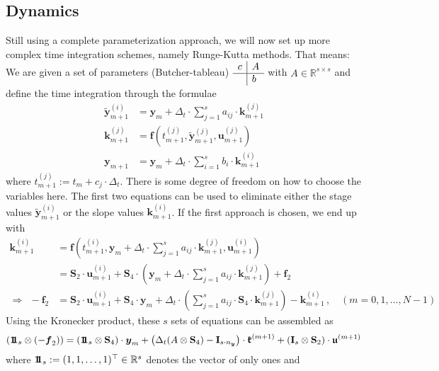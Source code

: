 \documentclass{article}
\newcommand{\defeq}{\mathrel{:=}}%
\newcommand{\tp}{\top}%
\newcommand{\kron}{\otimes}%
\newcommand{\setR}{\mathbb{R}}%
\newcommand{\vectorfont}[1]{\boldsymbol{#1}}%
\newcommand{\matrixfont}[1]{\mathbf{#1}}%
\newcommand{\fvec}{\vectorfont{f}}
\newcommand{\kvec}{\vectorfont{k}}
\newcommand{\uvec}{\vectorfont{u}}
\newcommand{\yvec}{\vectorfont{y}}
\newcommand{\tildeyvec}{\vectorfont{\tilde{y}}}
\newcommand{\kfrakvec}{\vectorfont{\mathfrak{k}}}
\newcommand{\ufrakvec}{\vectorfont{\mathfrak{u}}}
\newcommand{\einsvec}{\vectorfont{1}\negthinspace\negthinspace\vectorfont{1}} %
\newcommand{\Imat}{\matrixfont{I}}%
\newcommand{\Smat}{\matrixfont{S}}
\begin{document}
\subsection*{Dynamics}
%
Still using a complete parameterization approach, we will now set up more complex time integration schemes, namely Runge-Kutta methods.
That means: We are given a set of parameters (Butcher-tableau) $\begin{array}{r|l}c & A\\\hline & b\end{array}$ with $A \in \setR^{s \times s}$ and define the time integration through the formulae
\begin{equation}
\begin{split}
\tildeyvec_{m+1}^{(i)} &= \yvec_{m} + \Delta_t \cdot \sum_{j=1}^s a_{ij} \cdot \kvec_{m+1}^{(j)} \\
\kvec_{m+1}^{(j)} &= \fvec \left(t_{m+1}^{(j)}, \tildeyvec_{m+1}^{(j)}, \uvec_{m+1}^{(j)}  \right)\\
\yvec_{m+1} &= \yvec_m + \Delta_t \cdot \sum_{i=1}^s b_i \cdot \kvec_{m+1}^{(i)}
\end{split} 
\label{eq:RK_scheme}
\end{equation}
where $t_{m+1}^{(j)} \defeq t_m + c_j \cdot \Delta_t$.
There is some degree of freedom on how to choose the variables here.
The first two equations can be used to eliminate either the stage values $\tildeyvec_{m+1}^{(i)}$ or the slope values $\kvec_{m+1}^{(i)}$.
If the first approach is chosen, we end up with
\begin{align*}
\kvec_{m+1}^{(i)} &= \fvec \left(t_{m+1}^{(i)}, \yvec_{m} + \Delta_t \cdot \sum_{j=1}^s a_{ij} \cdot \kvec_{m+1}^{(j)}, \uvec_{m+1}^{(i)}\right)
\\
 &= \Smat_2 \cdot \uvec_{m+1}^{(i)} + \Smat_4 \cdot \left(\yvec_m + \Delta_t \cdot \sum_{j=1}^s a_{ij}\cdot \kvec_{m+1}^{(j)}\right) + \fvec_2
\\
\Rightarrow~~
-\fvec_2 &= \Smat_2 \cdot \uvec_{m+1}^{(i)} + \Smat_4 \cdot \yvec_m + \Delta_t \cdot \left(\sum_{j=1}^s a_{ij} \cdot \Smat_4 \cdot \kvec_{m+1}^{(j)}\right) - \kvec_{m+1}^{(i)}\,,\quad
(m=0,1,\ldots, N-1)
\end{align*}
Using the Kronecker product, these $s$ sets of equations can be assembled as
\[
(\einsvec_s \kron (-\fvec_2)) = (\einsvec_s \kron \Smat_4) \cdot \yvec_m  + \left( \Delta_t (A \kron \Smat_4) - \Imat_{s\cdot n_{\yvec}}\right)\cdot \kfrakvec^{(m+1)} + (\Imat_s \kron \Smat_2) \cdot \ufrakvec^{(m+1)}
\]
where $\einsvec_s \defeq (1,1,\ldots,1)^{\tp} \in \setR^s$ denotes the vector of only ones and
\end{document}

